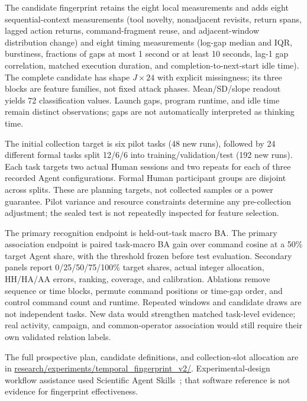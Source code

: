 \documentclass[11pt]{article}
\begin{document}
The candidate fingerprint retains the eight local measurements and adds eight sequential-context measurements (tool novelty, nonadjacent revisits, return spans, lagged action returns, command-fragment reuse, and adjacent-window distribution change) and eight timing measurements (log-gap median and IQR, burstiness, fractions of gaps at most 1 second or at least 10 seconds, lag-1 gap correlation, matched execution duration, and completion-to-next-start idle time). The complete candidate has shape $J\times24$ with explicit missingness; its three blocks are feature families, not fixed attack phases. Mean/SD/slope readout yields 72 classification values. Launch gaps, program runtime, and idle time remain distinct observations; gaps are not automatically interpreted as thinking time.

The initial collection target is six pilot tasks (48 new runs), followed by 24 different formal tasks split 12/6/6 into training/validation/test (192 new runs). Each task targets two actual Human sessions and two repeats for each of three recorded Agent configurations. Formal Human participant groups are disjoint across splits. These are planning targets, not collected samples or a power guarantee. Pilot variance and resource constraints determine any pre-collection adjustment; the sealed test is not repeatedly inspected for feature selection.

The primary recognition endpoint is held-out-task macro BA. The primary association endpoint is paired task-macro BA gain over command cosine at a 50\% target Agent share, with the threshold frozen before test evaluation. Secondary panels report 0/25/50/75/100\% target shares, actual integer allocation, HH/HA/AA errors, ranking, coverage, and calibration. Ablations remove sequence or time blocks, permute command positions or time-gap order, and control command count and runtime. Repeated windows and candidate draws are not independent tasks. New data would strengthen matched task-level evidence; real activity, campaign, and common-operator association would still require their own validated relation labels.

The full prospective plan, candidate definitions, and collection-slot allocation are in \url{research/experiments/temporal_fingerprint_v2/}. Experimental-design workflow assistance used Scientific Agent Skills~\cite{skills}; that software reference is not evidence for fingerprint effectiveness.
\end{document}
